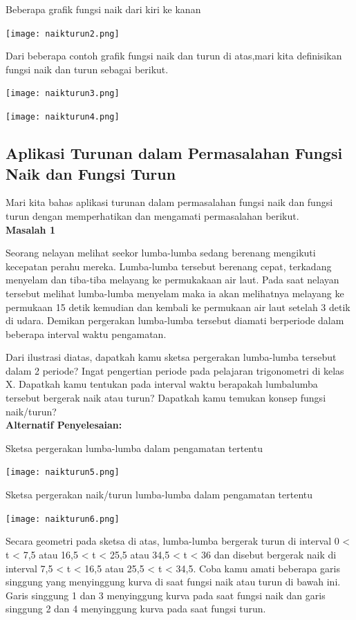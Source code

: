 \documentclass[11pt,fleqn]{book} %
\begin{document}
Beberapa grafik fungsi naik dari kiri ke kanan

\texttt{[image: naikturun2.png]}

Dari beberapa contoh grafik fungsi naik dan turun di atas,mari kita definisikan fungsi naik dan turun sebagai berikut.

\texttt{[image: naikturun3.png]}

\texttt{[image: naikturun4.png]}

\subsection{Aplikasi Turunan dalam Permasalahan Fungsi Naik dan Fungsi Turun}

Mari kita bahas aplikasi turunan dalam permasalahan fungsi naik dan fungsi turun dengan memperhatikan dan mengamati permasalahan berikut.\\

\textbf{Masalah 1}

Seorang nelayan melihat seekor lumba-lumba sedang berenang mengikuti kecepatan perahu mereka. Lumba-lumba tersebut berenang cepat, terkadang menyelam dan tiba-tiba melayang ke permukakaan air laut. Pada saat nelayan tersebut melihat lumba-lumba menyelam maka ia akan melihatnya melayang ke permukaan 15 detik kemudian dan kembali ke permukaan air laut setelah 3 detik di udara. Demikan pergerakan lumba-lumba tersebut diamati berperiode dalam beberapa interval waktu pengamatan.

Dari ilustrasi diatas, dapatkah kamu sketsa pergerakan lumba-lumba tersebut dalam 2 periode? Ingat pengertian periode pada pelajaran trigonometri di kelas X. Dapatkah kamu tentukan pada interval waktu berapakah lumbalumba tersebut bergerak naik atau turun? Dapatkah kamu temukan konsep fungsi naik/turun?\\

\textbf{Alternatif Penyelesaian:}

Sketsa pergerakan lumba-lumba dalam pengamatan tertentu

\texttt{[image: naikturun5.png]}

Sketsa pergerakan naik/turun lumba-lumba dalam pengamatan tertentu

\texttt{[image: naikturun6.png]}

Secara geometri pada sketsa di atas, lumba-lumba bergerak turun di interval 0 < t < 7,5 atau 16,5 < t < 25,5 atau 34,5 < t < 36 dan disebut bergerak naik di interval 7,5 < t < 16,5 atau 25,5 < t < 34,5.
Coba kamu amati beberapa garis singgung yang menyinggung kurva di saat fungsi naik atau turun di bawah ini. Garis singgung 1 dan 3 menyinggung kurva pada saat fungsi naik dan garis singgung 2 dan 4 menyinggung kurva pada saat fungsi turun.
\end{document}
